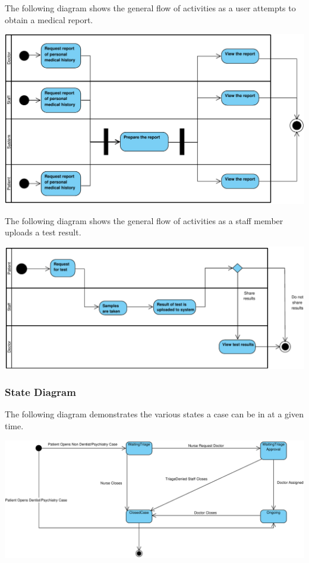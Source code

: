 \documentclass[a4paper, 12pt, titlepage]{article}
\begin{document}
  The following diagram shows the general flow of activities as a user attempts to obtain a medical report.

  \includegraphics[width=\linewidth]{activity_diag_report.pdf}

  \pagebreak
  The following diagram shows the general flow of activities as a staff member uploads a test result.

  \includegraphics[width=\linewidth]{activity_diag_test.pdf}

  \subsubsection{State Diagram}

  The following diagram demonstrates the various states a case can be in at a given time.

  \includegraphics[width=\linewidth]{state_diag_case}
\end{document}
